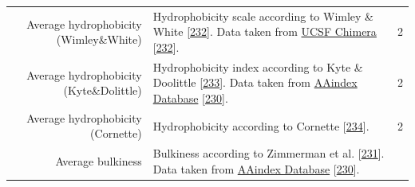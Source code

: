 \documentclass[11pt,a4paper,twoside]{book}
\theoremstyle{definition}
\theoremstyle{definition}
\theoremstyle{remark}
\begin{document}
\begin{longtable}[]{@{}rlc@{}}
\begin{minipage}[t]{0.23\columnwidth}
Average hydrophobicity (Wimley\&White)\strut
\end{minipage} & \begin{minipage}[t]{0.50\columnwidth}\raggedright\strut
Hydrophobicity scale according to Wimley \& White
{[}\protect\hyperlink{ref-Wimley1996}{232}{]}. Data taken from
\href{https://www.cgl.ucsf.edu/chimera/docs/ContributedSoftware/defineattrib/wwHydrophobicity.txt}{UCSF
Chimera} {[}\protect\hyperlink{ref-Wimley1996}{232}{]}.\strut
\end{minipage} & \begin{minipage}[t]{0.18\columnwidth}\centering\strut
2\strut
\end{minipage}\tabularnewline
\begin{minipage}[t]{0.23\columnwidth}\raggedleft\strut
Average hydrophobicity (Kyte\&Dolittle)\strut
\end{minipage} & \begin{minipage}[t]{0.50\columnwidth}\raggedright\strut
Hydrophobicity index according to Kyte \& Doolittle
{[}\protect\hyperlink{ref-Kyte1982}{233}{]}. Data taken from
\href{http://www.genome.jp/dbget-bin/www_bget?aaindex:KYTJ820101}{AAindex
Database} {[}\protect\hyperlink{ref-Kawashima2008}{230}{]}.\strut
\end{minipage} & \begin{minipage}[t]{0.18\columnwidth}\centering\strut
2\strut
\end{minipage}\tabularnewline
\begin{minipage}[t]{0.23\columnwidth}\raggedleft\strut
Average hydrophobicity (Cornette)\strut
\end{minipage} & \begin{minipage}[t]{0.50\columnwidth}\raggedright\strut
Hydrophobicity according to Cornette
{[}\protect\hyperlink{ref-Cornette1987}{234}{]}.\strut
\end{minipage} & \begin{minipage}[t]{0.18\columnwidth}\centering\strut
2\strut
\end{minipage}\tabularnewline
\begin{minipage}[t]{0.23\columnwidth}\raggedleft\strut
Average bulkiness\strut
\end{minipage} & \begin{minipage}[t]{0.50\columnwidth}\raggedright\strut
Bulkiness according to Zimmerman et al.
{[}\protect\hyperlink{ref-Zimmerman1968}{231}{]}. Data taken from
\href{http://www.genome.jp/dbget-bin/www_bget?aaindex:ZIMJ680102}{AAindex
Database} {[}\protect\hyperlink{ref-Kawashima2008}{230}{]}.\strut

\end{minipage}
\end{longtable}
\end{document}

